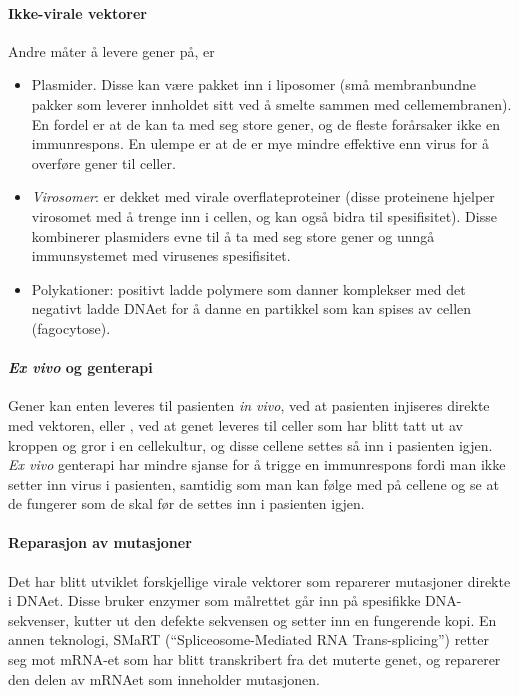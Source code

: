 \paragraph{Ikke-virale vektorer} Andre måter å levere gener på, er
\begin{itemize}[noitemsep,nolistsep]
	\item Plasmider. Disse kan være pakket inn i liposomer (små membranbundne pakker som leverer innholdet sitt ved å smelte sammen med cellemembranen). En fordel er at de kan ta med seg store gener, og de fleste forårsaker ikke en immunrespons. En ulempe er at de er mye mindre effektive enn virus for å overføre gener til celler. 
	\item \emph{Virosomer}: er dekket med virale overflateproteiner (disse proteinene hjelper virosomet med å trenge inn i cellen, og kan også bidra til spesifisitet). Disse kombinerer plasmiders evne til å ta med seg store gener og unngå immunsystemet med virusenes spesifisitet.
	\item Polykationer: positivt ladde polymere som danner komplekser med det negativt ladde DNAet for å danne en partikkel som kan spises av cellen (fagocytose).
\end{itemize}

\paragraph{\emph{Ex vivo} og  genterapi} Gener kan enten leveres til pasienten \emph{in vivo}, ved at pasienten injiseres direkte med vektoren, eller , ved at genet leveres til celler som har blitt tatt ut av kroppen og gror i en cellekultur, og disse cellene settes så inn i pasienten igjen. \emph{Ex vivo} genterapi har mindre sjanse for å trigge en immunrespons fordi man ikke setter inn virus i pasienten, samtidig som man kan følge med på cellene og se at de fungerer som de skal før de settes inn i pasienten igjen.

\paragraph{Reparasjon av mutasjoner} Det har blitt utviklet forskjellige virale vektorer som reparerer mutasjoner direkte i DNAet. Disse bruker enzymer som målrettet går inn på spesifikke DNA-sekvenser, kutter ut den defekte sekvensen og setter inn en fungerende kopi. En annen teknologi, SMaRT (``Spliceosome-Mediated RNA Trans-splicing'') retter seg mot mRNA-et som har blitt transkribert fra det muterte genet, og reparerer den delen av mRNAet som inneholder mutasjonen.

